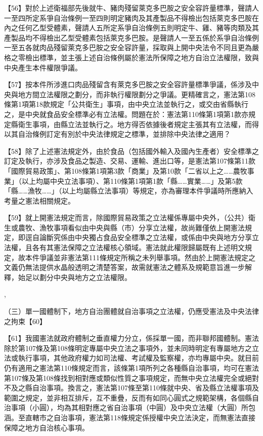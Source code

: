 \documentclass{ctexart} %
\begin{document}
{【56】對於上述衛福部先後就牛、豬肉殘留萊克多巴胺之安全容許量標準，聲請人一至四所定系爭自治條例一至四則明定豬肉及其產製品不得檢出包括萊克多巴胺在內之任何乙型受體素，聲請人五所定系爭自治條例五則明定牛、雞、豬等肉類及其產製品均不得檢出乙型受體素包括萊克多巴胺。是聲請人一至五係於系爭自治條例一至五各就肉品殘留萊克多巴胺之安全容許量，採取與上開中央法令不同且更為嚴格之零檢出標準，並主張上述自治條例屬於憲法所保障之地方自治立法權限，致與中央產生本件權限爭議。



【57】按本件所涉進口肉品殘留含有萊克多巴胺之安全容許量標準爭議，係涉及中央與地方間立法權限之劃分，而非執行權限劃分之爭議。更精確言之，憲法第108條第1項第18款規定「公共衛生」事項，由中央立法並執行之，或交由省縣執行之，是中央就食品安全標準必有立法權。問題在於：憲法第110條第1項第1款亦規定縣衛生事項，由縣立法並執行之。地方得否依據後者規定主張其有立法權，而得以其自治條例訂定有別於中央法律規定之標準，並排除中央法律之適用？

【58】除了上述憲法規定外，由於食品（包括國外輸入及國內生產者）安全標準之訂定及執行，亦涉及食品之製造、交易、運輸、進出口等，是憲法第107條第11款「國際貿易政策」、第108條第1項第3款「商業」及第10款「二省以上之……農牧事業」（以上均屬中央立法事項）、第110條第1項第1款「縣……實業……」及第5款「縣……漁牧……」（以上均屬縣立法事項）等規定，亦為審理本件爭議時所應納入考量之憲法相關規定。

【59】就上開憲法規定而言，除國際貿易政策之立法權係專屬中央外，（公共）衛生或農牧、漁牧事項看似由中央與縣（市）分享立法權，故尚難僅依上開憲法規定，即逕自論斷究係由中央獨占食品安全標準之立法權，或係由中央與地方分享立法權，且各有其憲法保障之立法權核心領域。憲法就此權限歸屬既有上述明文規定，故本件爭議並非憲法第111條規定所稱之未列舉事項。然由於上開憲法規定之文義仍無法提供水晶般透明之清楚答案，故需就憲法之體系及規範意旨進一步解釋，始足以劃分中央與地方之立法權限。


\sep


（三）單一國體制下，地方自治團體就自治事項之立法權，仍應受憲法及中央法律之拘束【60】

【61】我國憲法就政府體制之垂直權力分立，係採單一國，而非聯邦國體制。憲法除於第107條及第108條明定專屬中央立法之事項外，並未同時明定有專屬地方之立法或執行事項，其他政府權力如司法權、考試權及監察權，亦均專屬中央。就目前仍有適用之憲法第110條規定而言，該條第1項所列之各種縣自治事項，均可在憲法第107條及第108條找到相對應或類似性質之事項規定，而無中央立法權完全或絕對不及之縣自治事項。換言之，憲法第107條至第110條就中央、省及縣立法權事項及範圍之規定，並非相互排斥，互不重疊，反而有如同心圓式之規範架構，各個縣自治事項（小圓），均為其相對應之省自治事項（中圓）及中央立法權（大圓）所包涵。至直轄市之自治事項，憲法第118條規定係授權中央立法決定，而無憲法直接保障之地方自治核心事項。

}
\end{document}
